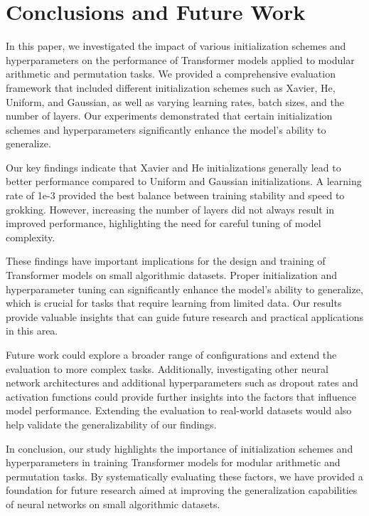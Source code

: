 \documentclass{article} %
\begin{document}
\section{Conclusions and Future Work}
\label{sec:conclusion}

In this paper, we investigated the impact of various initialization schemes and hyperparameters on the performance of Transformer models applied to modular arithmetic and permutation tasks. We provided a comprehensive evaluation framework that included different initialization schemes such as Xavier, He, Uniform, and Gaussian, as well as varying learning rates, batch sizes, and the number of layers. Our experiments demonstrated that certain initialization schemes and hyperparameters significantly enhance the model's ability to generalize.

Our key findings indicate that Xavier and He initializations generally lead to better performance compared to Uniform and Gaussian initializations. A learning rate of 1e-3 provided the best balance between training stability and speed to grokking. However, increasing the number of layers did not always result in improved performance, highlighting the need for careful tuning of model complexity.

These findings have important implications for the design and training of Transformer models on small algorithmic datasets. Proper initialization and hyperparameter tuning can significantly enhance the model's ability to generalize, which is crucial for tasks that require learning from limited data. Our results provide valuable insights that can guide future research and practical applications in this area.

Future work could explore a broader range of configurations and extend the evaluation to more complex tasks. Additionally, investigating other neural network architectures and additional hyperparameters such as dropout rates and activation functions could provide further insights into the factors that influence model performance. Extending the evaluation to real-world datasets would also help validate the generalizability of our findings.

In conclusion, our study highlights the importance of initialization schemes and hyperparameters in training Transformer models for modular arithmetic and permutation tasks. By systematically evaluating these factors, we have provided a foundation for future research aimed at improving the generalization capabilities of neural networks on small algorithmic datasets.



\end{document}
